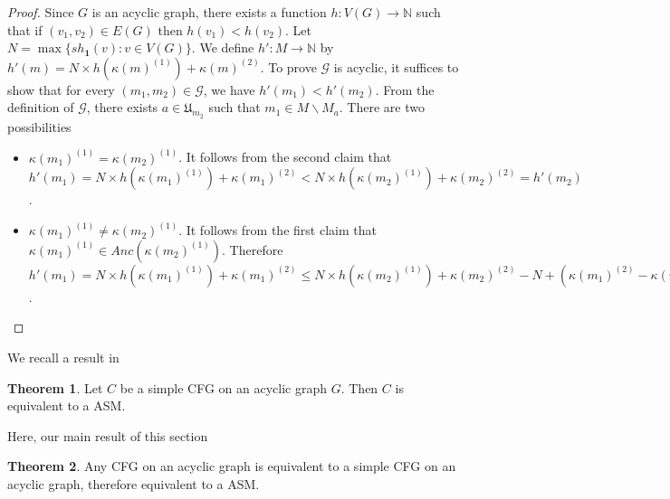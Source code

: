 \documentclass{article}
\theoremstyle{definition}
\newtheorem{theo}{Theorem}
\newcommand\downvertices[1]{Anc(#1)}
\newcommand\shotvector[2]{sh_{#1}(#2)}
\newcommand\set[1]{\{ #1 \}}
\begin{document}
\begin{proof}
Since $G$ is an acyclic graph, there exists a function $h:V(G)\to \mathbb{N}$ such that if $(v_1,v_2)\in E(G)$ then $h(v_1)<h(v_2)$. Let $N=\max \set{\shotvector{\textbf{1}}{v}: v\in V(G)}$. We define $h':M\to \mathbb{N}$ by $h'(m)=N\times h(\kappa(m)^{(1)})+\kappa(m)^{(2)}$. To prove $\mathcal{G}$ is acyclic, it suffices to show that for every $(m_1,m_2) \in \mathcal{G}$, we have $h'(m_1)<h'(m_2)$. From the definition of $\mathcal{G}$, there exists $a \in \mathfrak{U}_{m_2}$ such that $m_1 \in M\backslash M_a$. There are two possibilities
\begin{itemize}
  \item[a. ] $\kappa(m_1)^{(1)}=\kappa(m_2)^{(1)}$.  It follows from the second claim that $h'(m_1)=N \times h(\kappa(m_1)^{(1)})+\kappa(m_1)^{(2)}<N \times h(\kappa(m_2)^{(1)})+\kappa(m_2)^{(2)}=h'(m_2)$. 
  \item[b. ] $\kappa(m_1)^{(1)}\neq \kappa(m_2)^{(1)}$. It follows from the first claim that $\kappa(m_1)^{(1)}\in \downvertices{\kappa(m_2)^{(1)}}$.  Therefore $h'(m_1)=N \times h(\kappa(m_1)^{(1)})+\kappa(m_1)^{(2)}\leq N \times h(\kappa(m_2)^{(1)})+\kappa(m_2)^{(2)}-N+(\kappa(m_1)^{(2)}-\kappa(m_2)^{(2)})<N \times h(\kappa(m_2)^{(1)})+\kappa(m_2)^{(2)}=h'(m_2)$.
\end{itemize}  
\end{proof}
We recall a result in \cite{Mag03}
\begin{theo}
\label{theorem of Magnien}\cite{Mag03} 
Let $C$ be a simple CFG on an acyclic graph $G$. Then $C$ is equivalent to a ASM.
\end{theo}
Here, our main result of this section
\begin{theo}
\label{CFGs on acyclic graph including in ASM}
Any CFG on an acyclic graph is equivalent to a simple CFG on an acyclic graph, therefore equivalent to a ASM.
\end{theo}
\end{document}
